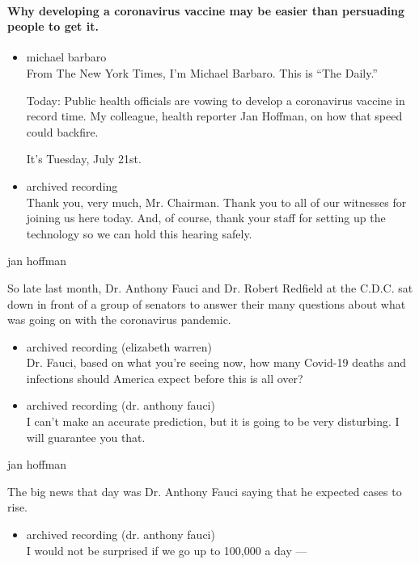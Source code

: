 \hypertarget{why-developing-a-coronavirus-vaccine-may-be-easier-than-persuading-people-to-get-it}{%
\paragraph{Why developing a coronavirus vaccine may be easier than
persuading people to get
it.}\label{why-developing-a-coronavirus-vaccine-may-be-easier-than-persuading-people-to-get-it}}

\begin{itemize}
\item
  michael barbaro\\
  From The New York Times, I'm Michael Barbaro. This is ``The Daily.''

  Today: Public health officials are vowing to develop a coronavirus
  vaccine in record time. My colleague, health reporter Jan Hoffman, on
  how that speed could backfire.

  It's Tuesday, July 21st.
\item
  archived recording\\
  Thank you, very much, Mr. Chairman. Thank you to all of our witnesses
  for joining us here today. And, of course, thank your staff for
  setting up the technology so we can hold this hearing safely.
\end{itemize}

jan hoffman

So late last month, Dr. Anthony Fauci and Dr. Robert Redfield at the
C.D.C. sat down in front of a group of senators to answer their many
questions about what was going on with the coronavirus pandemic.

\begin{itemize}
\item
  archived recording (elizabeth warren)\\
  Dr. Fauci, based on what you're seeing now, how many Covid-19 deaths
  and infections should America expect before this is all over?
\item
  archived recording (dr. anthony fauci)\\
  I can't make an accurate prediction, but it is going to be very
  disturbing. I will guarantee you that.
\end{itemize}

jan hoffman

The big news that day was Dr. Anthony Fauci saying that he expected
cases to rise.

\begin{itemize}
\tightlist
\item
  archived recording (dr. anthony fauci)\\
  I would not be surprised if we go up to 100,000 a day ---
\end{itemize}

